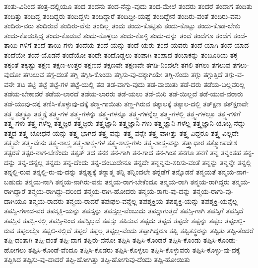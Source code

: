 {ತಂತು-ವಿನಿಂದ
ತಂತ್ರ-ದಲ್ಲಿಯೂ
ತಂದ
ತಂದನು
ತಂದ-ನೆನ್ನು-ವುದು
ತಂದ-ಮೇಲೆ
ತಂದರು
ತಂದರೆ
ತಂದಾಗ
ತಂದಿತು
ತಂದಿತ್ತು
ತಂದಿದ್ದ
ತಂದಿದ್ದರು
ತಂದಿದ್ದಳು
ತಂದಿದ್ದಾರೆ
ತಂದಿದ್ದೀ-ಯಷ್ಟೆ
ತಂದಿದ್ದೇನೆ
ತಂದಿರು-ವಂತೆ
ತಂದಿರು-ವನು
ತಂದಿರು-ವರು
ತಂದಿರುವೆ
ತಂದಿರು-ವೆನು
ತಂದಿಲ್ಲ
ತಂದು
ತಂದು-ಕೊಟ್ಟಿತು
ತಂದು-ಕೊಟ್ಟು
ತಂದು-ಕೊಡ-ಬೇಕು
ತಂದು-ಕೊಡುತ್ತಿದ್ದ
ತಂದು-ಕೊಡುವೆ
ತಂದು-ಕೊಳ್ಳಲು
ತಂದು-ಕೊಳ್ಳಿ
ತಂದು-ದನ್ನು
ತಂದೆ
ತಂದೆಗೂ
ತಂದೆಗೆ
ತಂದೆ-ತಾಯಿ-ಗಳಿಗೆ
ತಂದೆ-ತಾಯಿ-ಗಳು
ತಂದೆಯ
ತಂದೆ-ಯನ್ನು
ತಂದೆ-ಯರು
ತಂದೆ-ಯವರು
ತಂದೆ-ಯಾಗಿ
ತಂದೆ-ಯಾದ
ತಂದೆಯೇ
ತಂದೆ-ಯೊಡನೆ
ತಂದೆಯೋ
ತಂದೇ
ತಂದೊಡ್ಡಲು
ತಂಪಾಗಿ
ತಂಪಾದ
ತಂಬಾಕನ್ನು
ತಂಬೂರಿಯ
ತಕ್ಕ
ತಕ್ಕಂತೆ
ತಕ್ಕಷ್ಟು
ತಕ್ಷಣ
ತಕ್ಷಣ-ಉತ್ತರ
ತಕ್ಷಣವೆ
ತಕ್ಷಣವೇ
ತಕ್ಷಣವೇ
ತಗಡಿ-ನಿಂದಲೇ
ತಗಲಿ
ತಗಲು
ತಗಲುವ
ತಗಲು-ವುದೋ
ತಗುಲುವ
ತಗ್ಗ-ದಂತೆ
ತಗ್ಗಿ
ತಗ್ಗಿಸಿ-ಕೊಂಡು
ತಗ್ಗಿಸು-ವು-ದಕ್ಕಾಗಿಯೇ
ತಗ್ಗಿ-ಸೆಂದು
ತಗ್ಗು
ತಗ್ಗುತ್ತಿದೆ
ತಗ್ಗು-ವ-ವನೇ
ತಟ
ತಟ್ಟಿ
ತಟ್ಟೆ
ತಟ್ಟೆ-ಗಳ
ತಟ್ಟೆ-ಯಲ್ಲಿ
ತಡ
ತಡ-ವಾಗು-ವುದು
ತಡ-ವಾಯಿತು
ತಡೆ-ದರು
ತಡೆಯ-ಬಲ್ಲವರಿಲ್ಲ
ತಡೆಯ-ಬೇಕಾದರೆ
ತಡೆಯ-ಲಾರದೆ
ತಡೆಯ-ಲಾರರು
ತಡೆ-ಯಲು
ತಡೆ-ಯಿರಿ
ತಡೆ-ಯಿಲ್ಲದೆ
ತಡೆ-ಯುವ-ವರಾರು
ತಡೆ-ಯುವು-ದಕ್ಕೆ
ತಣಿಸಿ-ಕೊಳ್ಳುವು-ದಕ್ಕೆ
ತಣ್ಣ-ಗಾಯಿತು
ತಣ್ಣ-ಗಿರುವ
ತತ್ಕಾಲಕ್ಕೆ
ತತ್ಕಾಲ-ದಲ್ಲಿ
ತತ್ಕ್ಷಣ
ತತ್ಕ್ಷಣವೇ
ತತ್ತ್ವ
ತತ್ತ್ವಕ್ಕೂ
ತತ್ತ್ವಕ್ಕೆ
ತತ್ತ್ವ-ಗಳ
ತತ್ತ್ವ-ಗಳನ್ನು
ತತ್ತ್ವ-ಗಳನ್ನೂ
ತತ್ತ್ವ-ಗಳನ್ನೆಲ್ಲ
ತತ್ತ್ವ-ಗಳಲ್ಲಿ
ತತ್ತ್ವ-ಗಳಲ್ಲೂ
ತತ್ತ್ವ-ಗಳಿಗೆ
ತತ್ತ್ವ-ಗಳು
ತತ್ತ್ವ-ಗಳೆಲ್ಲ
ತತ್ತ್ವಜ್ಞರ
ತತ್ತ್ವಜ್ಞರು
ತತ್ತ್ವಜ್ಞಾನಿ
ತತ್ತ್ವಜ್ಞಾನಿ-ಗಳು
ತತ್ತ್ವಜ್ಞಾನಿ-ಗಳೆಲ್ಲ
ತತ್ತ್ವಜ್ಞಾನಿ-ಯೊಬ್ಬ-ನೆದ್ದು
ತತ್ತ್ವದ
ತತ್ತ್ವ-ಬೋಧನೆ-ಯನ್ನು
ತತ್ತ್ವ-ಭಾಗದ
ತತ್ತ್ವ-ವನ್ನು
ತತ್ತ್ವ-ವನ್ನೇ
ತತ್ತ್ವ-ವಾಗಿತ್ತು
ತತ್ತ್ವ-ವಿದ್ದರೂ
ತತ್ತ್ವ-ವಿಲ್ಲದೇ
ತತ್ತ್ವವೇ
ತತ್ತ್ವ-ವೇನು
ತತ್ತ್ವ-ಶಾಸ್ತ್ರ
ತತ್ತ್ವ-ಶಾಸ್ತ್ರ-ಗಳ
ತತ್ತ್ವ-ಶಾಸ್ತ್ರ-ಗಳು
ತತ್ತ್ವ-ಶಾಸ್ತ್ರ-ವನ್ನು
ತತ್ತ್ವಾಧಾರ
ತತ್ತ್ವೋಪದೇಶ
ತತ್ಪರತೆ
ತತ್ಪರ-ನಾಗ-ಬೇಕೆಂದು
ತತ್ಸತ್
ತದ
ತನಕ
ತನ-ಗಾಗಿ
ತನ-ಗಾದ
ತನ-ಗಿಂತ
ತನಗೂ
ತನಗೆ
ತನ್ನ
ತನ್ನಂತಹ
ತನ್ನ-ದನ್ನು
ತನ್ನ-ದನ್ನೆಲ್ಲ
ತನ್ನದು
ತನ್ನ-ದೆಂದು
ತನ್ನ-ದೆಂಬುದೇನೂ
ತನ್ನದೇ
ತನ್ನನ್ನನು-ಸರಿಸು-ವಂತೆ
ತನ್ನನ್ನು
ತನ್ನನ್ನೇ
ತನ್ನಲ್ಲಿ
ತನ್ನಲ್ಲಿ-ರುವ
ತನ್ನಲ್ಲಿ-ರು-ವು-ದನ್ನು
ತನ್ನಷ್ಟಕ್ಕೆ
ತನ್ನಾತ್ಮ
ತನ್ನಿ
ತನ್ನಿಂದಲೇ
ತನ್ನೆಡೆಗೆ
ತನ್ನೊಡನೆ
ತನ್ಮಯತೆ
ತನ್ಮಯ-ನಾಗ-ಬಹುದು
ತನ್ಮಯ-ನಾಗಿ
ತನ್ಮಯ-ನಾಗಿರು-ವನು
ತನ್ಮಯ-ರಾಗ-ಬೇಕೆಂದೂ
ತನ್ಮಯ-ರಾಗಿ
ತನ್ಮಯ-ರಾಗಿದ್ದರು
ತನ್ಮಯ-ರಾಗಿದ್ದಾರೆ
ತನ್ಮಯ-ರಾಗಿದ್ದು-ದರಿಂದ
ತನ್ಮಯ-ರಾಗಿ-ಹೋದರು
ತನ್ಮಯ-ರಾಗು-ವು-ದನ್ನು
ತನ್ಮಯ-ರಾಗು-ವು-ದಾಗಿಯೂ
ತನ್ಮಯ-ರಾದರು
ತನ್ಮಯ-ರಾದರೆ
ತಪಃಫಲ-ವನ್ನೆಲ್ಲ
ತಪಶ್ಶಕ್ತಿಯ
ತಪಶ್ಶಕ್ತಿ-ಯನ್ನು
ತಪಶ್ಶಕ್ತಿ-ಯನ್ನೆಲ್ಲ
ತಪಸ್ವಿ-ಗಳಾದ-ವರ
ತಪಸ್ಶಕ್ತಿ-ಯನ್ನು
ತಪಸ್ಸನ್ನು
ತಪಸ್ಸಲ್ಲ-ವೆಂಬುದು
ತಪಸ್ಸಾಗುತ್ತದೆ
ತಪಸ್ಸಿ-ಗಾಗಿ
ತಪಸ್ಸಿಗೆ
ತಪಸ್ಸಿದೆ
ತಪಸ್ಸಿನ
ತಪಸ್ಸಿ-ನಲ್ಲಿ
ತಪಸ್ಸಿ-ನಿಂದ
ತಪಸ್ಸಿಲ್ಲದೆ
ತಪಸ್ಸು
ತಪಿಸುವ
ತಪ್ಪದು
ತಪ್ಪದೆ
ತಪ್ಪದೇ
ತಪ್ಪನ್ನು
ತಪ್ಪಲ
ತಪ್ಪಲಲ್ಲಿ-ರುವ
ತಪ್ಪಲಲ್ಲೊ
ತಪ್ಪಲಿ-ನಲ್ಲಿದೆ
ತಪ್ಪಲೆ
ತಪ್ಪಲ್ಲ
ತಪ್ಪಲ್ಲ-ವೆಂದು
ತಪ್ಪಾಗಿದ್ದರೂ
ತಪ್ಪಿ
ತಪ್ಪಿತಸ್ಥರನ್ನು
ತಪ್ಪಿತು
ತಪ್ಪಿ-ತೆಂದರೆ
ತಪ್ಪಿ-ದಂತಾಗಿ
ತಪ್ಪಿ-ದಂತೆ
ತಪ್ಪಿ-ದಾಗ
ತಪ್ಪಿರು-ವನೋ
ತಪ್ಪಿಸಿ
ತಪ್ಪಿಸಿ-ಕೊಂಡರೆ
ತಪ್ಪಿಸಿ-ಕೊಂಡು
ತಪ್ಪಿಸಿ-ಕೊಂಡು-ಹೋಗಲು
ತಪ್ಪಿಸಿ-ಕೊಂಡೆ-ವೆಂದೂ
ತಪ್ಪಿಸಿ-ಕೊಡರು
ತಪ್ಪಿಸಿ-ಕೊಳ್ಳಲು
ತಪ್ಪಿಸಿ-ಕೊಳ್ಳುವರು
ತಪ್ಪಿಸಿ-ಕೊಳ್ಳು-ವು-ದಕ್ಕೆ
ತಪ್ಪಿಸಿದ
ತಪ್ಪಿಸು-ವು-ದಾದರೆ
ತಪ್ಪಿ-ಹೋಗಿತ್ತು
ತಪ್ಪಿ-ಹೋಗುವು-ದೆಂದು
ತಪ್ಪಿ-ಹೋಯಿತು
}
